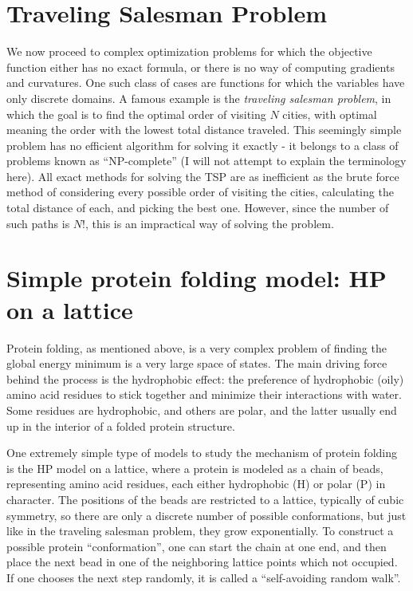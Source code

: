 \documentclass[
  letterpaper,
  DIV=11,
  numbers=noendperiod]{scrreprt}
\begin{document}
\section{Traveling Salesman Problem}\label{traveling-salesman-problem}

We now proceed to complex optimization problems for which the objective
function either has no exact formula, or there is no way of computing
gradients and curvatures. One such class of cases are functions for
which the variables have only discrete domains. A famous example is the
\emph{traveling salesman problem}, in which the goal is to find the
optimal order of visiting \(N\) cities, with optimal meaning the order
with the lowest total distance traveled. This seemingly simple problem
has no efficient algorithm for solving it exactly - it belongs to a
class of problems known as ``NP-complete'' (I will not attempt to
explain the terminology here). All exact methods for solving the TSP are
as inefficient as the brute force method of considering every possible
order of visiting the cities, calculating the total distance of each,
and picking the best one. However, since the number of such paths is
\(N!\), this is an impractical way of solving the problem.

\section{Simple protein folding model: HP on a
lattice}\label{simple-protein-folding-model-hp-on-a-lattice}

Protein folding, as mentioned above, is a very complex problem of
finding the global energy minimum is a very large space of states. The
main driving force behind the process is the hydrophobic effect: the
preference of hydrophobic (oily) amino acid residues to stick together
and minimize their interactions with water. Some residues are
hydrophobic, and others are polar, and the latter usually end up in the
interior of a folded protein structure.

One extremely simple type of models to study the mechanism of protein
folding is the HP model on a lattice, where a protein is modeled as a
chain of beads, representing amino acid residues, each either
hydrophobic (H) or polar (P) in character. The positions of the beads
are restricted to a lattice, typically of cubic symmetry, so there are
only a discrete number of possible conformations, but just like in the
traveling salesman problem, they grow exponentially. To construct a
possible protein ``conformation'', one can start the chain at one end,
and then place the next bead in one of the neighboring lattice points
which not occupied. If one chooses the next step randomly, it is called
a ``self-avoiding random walk''.
\end{document}
